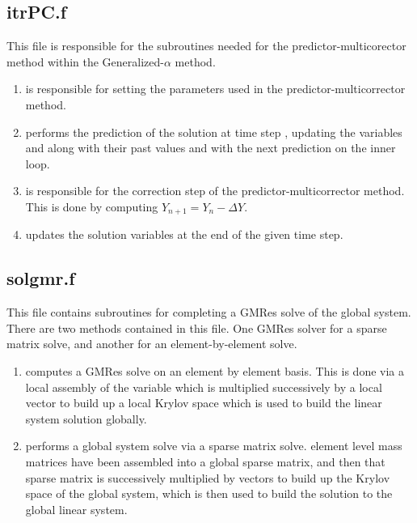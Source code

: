 \documentclass[./]{subfiles}
\begin{document}
\subsection{itrPC.f}
This file is responsible for the subroutines needed for the predictor-multicorector method within the Generalized-$\alpha$ method.
\begin{enumerate}
\item {} is responsible for setting the parameters used in the predictor-multicorrector method.
\item {} performs the prediction of the solution at time step , updating the variables  and  along with their past values  and  with the next prediction on the inner loop.
\item {} is responsible for the correction step of the predictor-multicorrector method. This is done by computing $Y_{n+1} = Y_n - \Delta Y$.
\item {} updates the solution variables at the end of the given time step.
\end{enumerate}

\subsection{solgmr.f}
This file contains subroutines for completing a GMRes solve of the global system. There are two methods contained in this file. One GMRes solver for a sparse matrix solve, and another for an element-by-element solve. 
\begin{enumerate}
\item {} computes a GMRes solve on an element by element basis. This is done via a local assembly of the variable  which is multiplied successively by a local vector to build up a local Krylov space which is used to build the linear system solution globally. 
\item {} performs a global system solve via a sparse matrix solve.  element level mass matrices have been assembled into a global sparse matrix, and then that sparse matrix is successively multiplied by vectors to build up the Krylov space of the global system, which is then used to build the solution to the global linear system. 
\end{enumerate}
\end{document}
